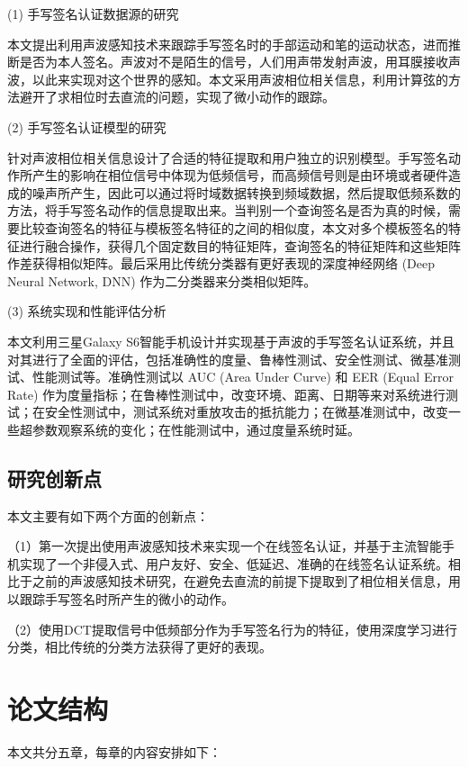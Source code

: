 (1) 手写签名认证数据源的研究

本文提出利用声波感知技术来跟踪手写签名时的手部运动和笔的运动状态，进而推断是否为本人签名。声波对不是陌生的信号，人们用声带发射声波，用耳膜接收声波，以此来实现对这个世界的感知。本文采用声波相位相关信息，利用计算弦的方法避开了求相位时去直流的问题，实现了微小动作的跟踪。


(2) 手写签名认证模型的研究

针对声波相位相关信息设计了合适的特征提取和用户独立的识别模型。手写签名动作所产生的影响在相位信号中体现为低频信号，而高频信号则是由环境或者硬件造成的噪声所产生，因此可以通过将时域数据转换到频域数据，然后提取低频系数的方法，将手写签名动作的信息提取出来。当判别一个查询签名是否为真的时候，需要比较查询签名的特征与模板签名特征的之间的相似度，本文对多个模板签名的特征进行融合操作，获得几个固定数目的特征矩阵，查询签名的特征矩阵和这些矩阵作差获得相似矩阵。最后采用比传统分类器有更好表现的深度神经网络 (Deep Neural Network, DNN)\cite{Schmidhuber2015Deep} 作为二分类器来分类相似矩阵。

(3) 系统实现和性能评估分析

本文利用三星Galaxy S6智能手机设计并实现基于声波的手写签名认证系统，并且对其进行了全面的评估，包括准确性的度量、鲁棒性测试、安全性测试、微基准测试、性能测试等。准确性测试以 AUC (Area Under Curve) 和 EER (Equal Error Rate) 作为度量指标；在鲁棒性测试中，改变环境、距离、日期等来对系统进行测试；在安全性测试中，测试系统对重放攻击的抵抗能力；在微基准测试中，改变一些超参数观察系统的变化；在性能测试中，通过度量系统时延。


\subsection{研究创新点}

本文主要有如下两个方面的创新点：

（1）第一次提出使用声波感知技术来实现一个在线签名认证，并基于主流智能手机实现了一个非侵入式、用户友好、安全、低延迟、准确的在线签名认证系统。相比于之前的声波感知技术研究，在避免去直流的前提下提取到了相位相关信息，用以跟踪手写签名时所产生的微小的动作。

（2）使用DCT提取信号中低频部分作为手写签名行为的特征，使用深度学习进行分类，相比传统的分类方法获得了更好的表现。

\section{论文结构}

本文共分五章，每章的内容安排如下：

